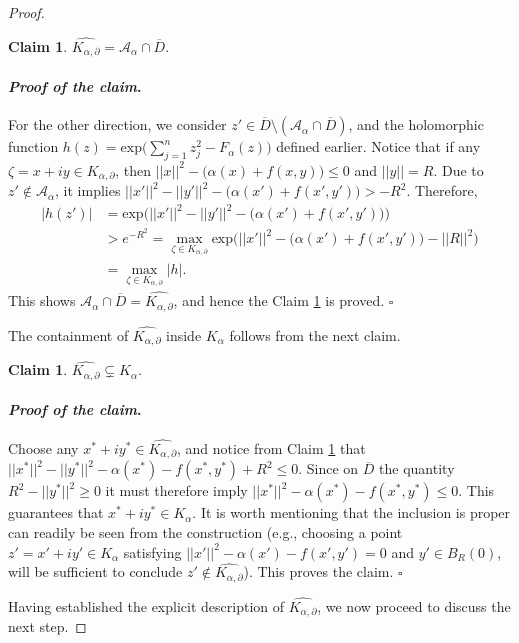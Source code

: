 \documentclass[12pt,reqno, a4paper]{amsart}
\newtheorem{claim}[theorem]{Claim}
\theoremstyle{definition}
\newenvironment{claimproof}{\paragraph{\textit{Proof of the claim}.}}{\hfill$\square$}
\theoremstyle{definition}
\numberwithin{equation}{section}
\begin{document}
\begin{proof}
\begin{claim}\label{claim_2}
$\widehat{K_{\alpha, \partial}}=\mathcal{A}_{\alpha}\cap\overline{D}.$
\end{claim}

\begin{claimproof}
For the other direction, we consider ${z'\in \overline{D}\setminus (\mathcal{A}_{\alpha} \cap \overline{D})}$, and the holomorphic function $h(z)=\text{exp}{\big(\sum_{j=1}^{n}z_j^2-F_{\alpha}(z)\big)}$ defined earlier. Notice that if any $\zeta=x+iy\in K_{\alpha,\partial}$, then $||x||^2-\big(\alpha(x)+f(x,y)\big)\leq 0$ and $||y||=R$. Due to $z'\notin \mathcal{A}_{\alpha}$, it implies $||x'||^2-||y'||^2-\big(\alpha(x')+f(x',y')\big)>-R^2$. Therefore,
\begin{align*}
	|h(z')| &= \text{exp}\big(||x'||^2-||y'||^2-\big(\alpha(x')+f(x',y')\big)\big)\\
	&>e^{-R^2}= \max_{\zeta\in K_{\alpha,\partial}}\text{exp}\big(||x'||^2-\big(\alpha(x')+f(x',y')\big)-||R||^2\big)\\
	&= \max_{\zeta\in K_{\alpha,\partial}}|h|.
\end{align*}
This shows $\mathcal{A}_{\alpha} \cap \overline{D}= \widehat{K_{\alpha,\partial}}$, and hence the Claim \ref{claim_2} is proved.
\end{claimproof}


The containment of $\widehat{K_{\alpha,\partial}}$ inside $K_{\alpha}$ follows from the  next claim.
\begin{claim}\label{claim_4}
$\widehat{K_{\alpha,\partial}}\subsetneq K_{\alpha}.$
\end{claim}

\begin{claimproof}
Choose any $x^*+iy^* \in \widehat{K_{\alpha,\partial}}$, and notice from Claim \ref{claim_2} that $||x^*||^2-||y^*||^2-\alpha(x^*)-f(x^*,y^*)+R^2\leq 0.$ Since on $\overline{D}$ the quantity $R^2-||y^*||^2\geq 0$ it must therefore imply $||x^*||^2-\alpha(x^*)-f(x^*,y^*)\leq 0.$ This guarantees that $x^*+iy^* \in K_{\alpha}.$ It is worth mentioning that the inclusion is proper can readily be seen from the construction (e.g., choosing a point $z'=x'+iy' \in K_{\alpha}$ satisfying $||x'||^2-\alpha(x')-f(x',y')=0$ and $y'\in B_R(0)$, will be sufficient to conclude ${z'\notin \widehat{K_{\alpha,\partial}}}$). This proves the claim.
\end{claimproof}

Having established the explicit description of $\widehat{K_{\alpha,\partial}}$, we now proceed to discuss the next step.



\end{proof}
\end{document}
